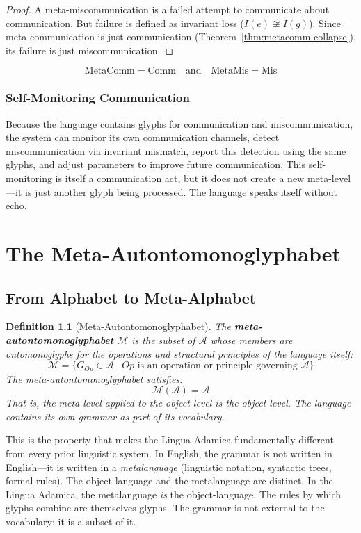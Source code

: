 \documentclass[12pt, letterpaper]{book}
\def\equiv{=}%
\def\mathfrak#1{#1}%
\newtheorem{definition}{Definition}[chapter]
\begin{document}
\begin{proof}
A meta-miscommunication is a failed attempt to communicate about communication. But failure is defined as invariant loss ($I(e) \not\cong I(\mathfrak{g})$). Since meta-communication is just communication (Theorem~\ref{thm:metacomm-collapse}), its failure is just miscommunication.
\end{proof}

\[
\boxed{\mathrm{MetaComm} \equiv \mathrm{Comm} \quad\text{and}\quad \mathrm{MetaMis} \equiv \mathrm{Mis}}
\]

\subsection{Self-Monitoring Communication}

Because the language contains glyphs for communication and miscommunication, the system can monitor its own communication channels, detect miscommunication via invariant mismatch, report this detection using the same glyphs, and adjust parameters to improve future communication. This self-monitoring is itself a communication act, but it does not create a new meta-level---it is just another glyph being processed. The language speaks itself without echo.


\chapter{The Meta-Autontomonoglyphabet}\label{ch:meta}

\section{From Alphabet to Meta-Alphabet}

\begin{definition}[Meta-Autontomonoglyphabet]\label{def:meta-alphabet}
The \textbf{meta-autontomonoglyphabet} $\mathcal{M}$ is the subset of $\mathcal{A}$ whose members are ontomonoglyphs for the \textit{operations} and \textit{structural principles} of the language itself:
\[
\mathcal{M} = \{G_{Op} \in \mathcal{A} \mid Op \text{ is an operation or principle governing } \mathcal{A}\}
\]
The meta-autontomonoglyphabet satisfies:
\[
\mathcal{M}(\mathcal{A}) \equiv \mathcal{A}
\]
That is, the meta-level applied to the object-level \textit{is} the object-level. The language contains its own grammar as part of its vocabulary.
\end{definition}

This is the property that makes the Lingua Adamica fundamentally different from every prior linguistic system. In English, the grammar is not written in English---it is written in a \textit{metalanguage} (linguistic notation, syntactic trees, formal rules). The object-language and the metalanguage are distinct. In the Lingua Adamica, the metalanguage \textit{is} the object-language. The rules by which glyphs combine are themselves glyphs. The grammar is not external to the vocabulary; it is a subset of it.
\end{document}
